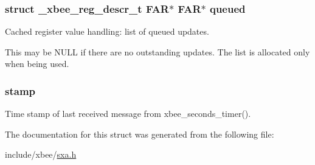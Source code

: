 \hypertarget{structsxa__node__t_a4be7d670379c92c9d32f55bc02a81add}{
\subsubsection[{queued}]{\setlength{\rightskip}{0pt plus 5cm}struct {\bf \-\_\-xbee\-\_\-reg\-\_\-descr\-\_\-t} {\bf F\-A\-R}$\ast$ {\bf F\-A\-R}$\ast$ queued}}\label{structsxa__node__t_a4be7d670379c92c9d32f55bc02a81add}


Cached register value handling\-: list of queued updates. 

This may be N\-U\-L\-L if there are no outstanding updates. The list is allocated only when being used. \hypertarget{structsxa__node__t_ac543485164457c0eefd43dcee04c82c6}{
\subsubsection[{stamp}]{ stamp}}\label{structsxa__node__t_ac543485164457c0eefd43dcee04c82c6}


Time stamp of last received message from xbee\-\_\-seconds\-\_\-timer(). 



The documentation for this struct was generated from the following file\-:\begin{DoxyCompactItemize}
\item 
include/xbee/\hyperlink{sxa_8h}{sxa.\-h}\end{DoxyCompactItemize}
